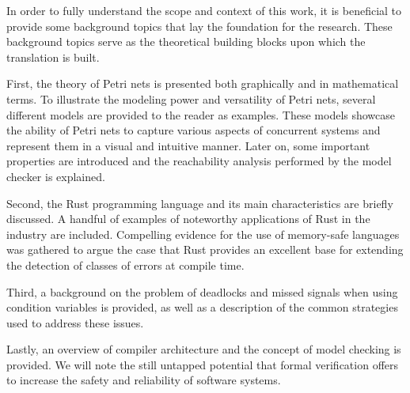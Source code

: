 In order to fully understand the scope and context of this work,
it is beneficial to provide some background topics
that lay the foundation for the research.
These background topics serve as the theoretical building blocks
upon which the translation is built.

First, the theory of Petri nets is presented
both graphically and in mathematical terms.
To illustrate the modeling power and versatility of Petri nets,
several different models are provided to the reader as examples.
These models showcase the ability of Petri nets
to capture various aspects of concurrent systems
and represent them in a visual and intuitive manner.
Later on, some important properties are introduced and the reachability analysis
performed by the model checker is explained.

Second, the Rust programming language and
its main characteristics are briefly discussed.
A handful of examples of noteworthy applications of Rust in the industry are included.
Compelling evidence for the use of memory-safe languages was gathered to argue
the case that Rust provides an excellent base
for extending the detection of classes of errors at compile time.

Third, a background
on the problem of deadlocks and missed signals when using condition variables is provided,
as well as a description of the common strategies used to address these issues.

Lastly, an overview of compiler architecture
and the concept of model checking is provided.
We will note the still untapped potential
that formal verification offers
to increase the safety and reliability of software systems.